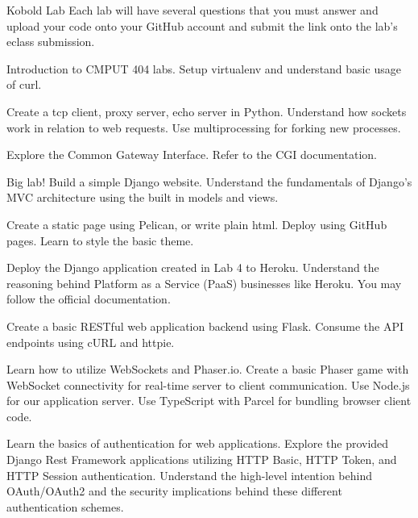 \documentclass[../CMPUT-404-Notes.tex]{subfiles}
\begin{document}
\begin{monsterbox}{Kobold Lab}
    Each lab will have several questions that you must answer and upload your code onto your GitHub account and submit the link onto the lab's eclass submission. 
    \begin{monsteraction}
        Introduction to CMPUT 404 labs. Setup virtualenv and understand basic usage of curl.
    \end{monsteraction}
    \begin{monsteraction}
        Create a tcp client, proxy server, echo server in Python. Understand how sockets work in relation to web requests. Use multiprocessing for forking new processes.
    \end{monsteraction}
    \begin{monsteraction}
        Explore the Common Gateway Interface. Refer to the CGI documentation.
    \end{monsteraction}
    \begin{monsteraction}
        Big lab! Build a simple Django website. Understand the fundamentals of Django's MVC architecture using the built in models and views.
    \end{monsteraction}
    \begin{monsteraction}
        Create a static page using Pelican, or write plain html. Deploy using GitHub pages. Learn to style the basic theme.
    \end{monsteraction}
    \begin{monsteraction}
        Deploy the Django application created in Lab 4 to Heroku. Understand the reasoning behind Platform as a Service (PaaS) businesses like Heroku. You may follow the official documentation.
    \end{monsteraction}
    \begin{monsteraction}
        Create a basic RESTful web application backend using Flask. Consume the API endpoints using cURL and httpie.
    \end{monsteraction}
    \begin{monsteraction}
        Learn how to utilize WebSockets and Phaser.io. Create a basic Phaser game with WebSocket connectivity for real-time server to client communication. Use Node.js for our application server. Use TypeScript with Parcel for bundling browser client code.
    \end{monsteraction}
    \begin{monsteraction}
        Learn the basics of authentication for web applications. Explore the provided Django Rest Framework applications utilizing HTTP Basic, HTTP Token, and HTTP Session authentication. Understand the high-level intention behind OAuth/OAuth2 and the security implications behind these different authentication schemes.
    \end{monsteraction}
\end{monsterbox}
\end{document}
